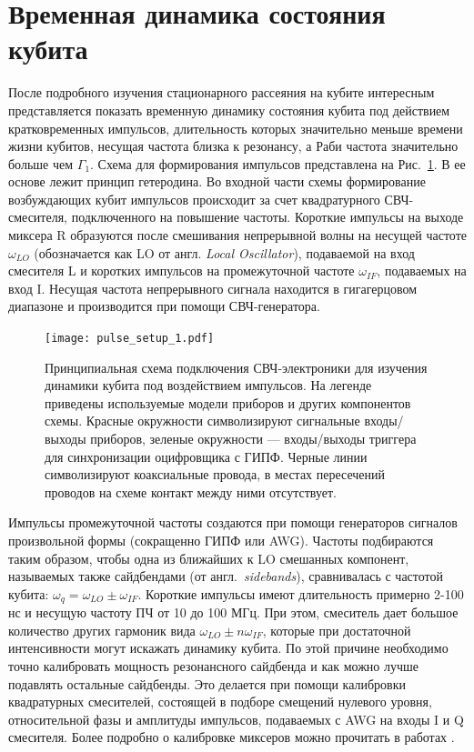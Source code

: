 \section{Временная динамика состояния кубита}
После подробного изучения стационарного рассеяния на кубите интересным представляется показать временную динамику состояния кубита под действием кратковременных импульсов, длительность которых значительно меньше времени жизни кубитов, несущая частота близка к резонансу, а Раби частота значительно больше чем $\Gamma_1$. Схема для формирования импульсов представлена на Рис.~\ref{fig: pulse_setup_1}. В ее основе лежит принцип гетеродина. Во входной части схемы  формирование возбуждающих кубит импульсов происходит за счет квадратурного СВЧ-смесителя, подключенного на повышение частоты. Короткие импульсы на выходе миксера R образуются после смешивания непрерывной волны на несущей частоте $\omega_{LO}$ (обозначается как LO от англ. \textit{Local Oscillator}), подаваемой на вход смесителя L и коротких импульсов на промежуточной частоте $\omega_{IF}$, подаваемых на вход I. Несущая частота непрерывного сигнала находится в гигагерцовом диапазоне и производится при помощи СВЧ-генератора.  

\begin{figure}[h]
	\centering
	\texttt{[image: pulse\_setup\_1.pdf]}
	\caption[Схема для изучения динамики кубита под воздействием коротких импульсов]{Принципиальная схема подключения СВЧ-электроники для изучения динамики кубита под воздействием импульсов. На легенде приведены используемые модели приборов и других компонентов схемы. Красные окружности символизируют сигнальные входы/выходы приборов, зеленые окружности --- входы/выходы триггера для синхронизации оцифровщика с ГИПФ. Черные линии символизируют коаксиальные провода, в местах пересечений проводов на схеме контакт между ними отсутствует. }
	\label{fig: pulse_setup_1}
\end{figure} 
Импульсы промежуточной частоты создаются при помощи генераторов сигналов произвольной формы (сокращенно ГИПФ или AWG). Частоты подбираются таким образом, чтобы одна из ближайших к LO смешанных компонент, называемых также сайдбендами (от англ.~\textit{sidebands}), сравнивалась с частотой кубита: $\omega_q = \omega_{LO} \pm \omega_{IF}$. Короткие импульсы имеют длительность примерно 2-100 нс и несущую частоту ПЧ от 10 до 100 МГц. При этом, смеситель дает большое количество других гармоник вида $\omega_{LO} \pm n\omega_{IF}$, которые при достаточной интенсивности могут искажать динамику кубита. По этой причине необходимо точно калибровать мощность резонансного сайдбенда и как можно лучше подавлять остальные сайдбенды. Это делается при помощи калибровки квадратурных смесителей, состоящей в подборе смещений нулевого уровня, относительной фазы и амплитуды импульсов, подаваемых с AWG на входы I и Q смесителя. Более подробно о калибровке миксеров можно прочитать в работах \cite{Schneider2015, jeffrey2014fast}.

